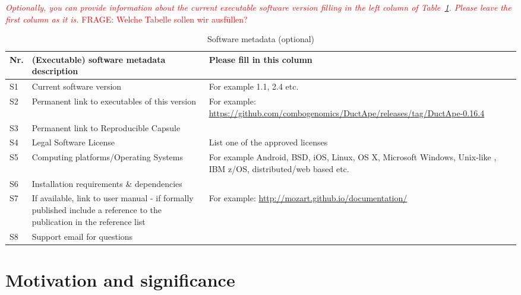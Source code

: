 \documentclass[preprint,12pt, a4paper]{elsarticle}
\begin{document}
\textcolor{red}{\textit{Optionally, you can provide information about the current executable
software version filling in the left column of
Table~\ref{executabelMetadata}. Please leave the first column as it is.} FRAGE: Welche Tabelle sollen wir ausfüllen?}

\begin{table}[!ht]
\begin{tabular}{|l|p{6.5cm}|p{6.5cm}|}
\hline
\textbf{Nr.} & \textbf{(Executable) software metadata description} & \textbf{Please fill in this column} \\
\hline
S1 & Current software version & For example 1.1, 2.4 etc. \\
\hline
S2 & Permanent link to executables of this version  & For example: \url{https://github.com/combogenomics/DuctApe/releases/tag/DuctApe-0.16.4} \\
\hline
S3  & Permanent link to Reproducible Capsule & \\
\hline
S4 & Legal Software License & List one of the approved licenses \\
\hline
S5 & Computing platforms/Operating Systems & For example Android, BSD, iOS, Linux, OS X, Microsoft Windows, Unix-like , IBM z/OS, distributed/web based etc. \\
\hline
S6 & Installation requirements \& dependencies & \\
\hline
S7 & If available, link to user manual - if formally published include a reference to the publication in the reference list & For example: \url{http://mozart.github.io/documentation/} \\
\hline
S8 & Support email for questions & \\
\hline
\end{tabular}
\caption{Software metadata (optional)}
\label{executabelMetadata} 
\end{table}


\section{Motivation and significance}
\end{document}
